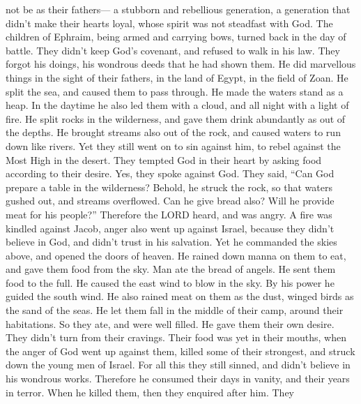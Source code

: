 not be as their fathers--- a stubborn and rebellious generation, a
generation that didn't make their hearts loyal, whose spirit was not
steadfast with God.  The children of Ephraim, being armed
and carrying bows, turned back in the day of battle.  They
didn't keep God's covenant, and refused to walk in his law.
 They forgot his doings, his wondrous deeds that he had
shown them.  He did marvellous things in the sight of their
fathers, in the land of Egypt, in the field of Zoan.  He
split the sea, and caused them to pass through. He made the waters stand
as a heap.  In the daytime he also led them with a cloud,
and all night with a light of fire.  He split rocks in the
wilderness, and gave them drink abundantly as out of the depths.
 He brought streams also out of the rock, and caused waters
to run down like rivers.  Yet they still went on to sin
against him, to rebel against the Most High in the desert. 
They tempted God in their heart by asking food according to their
desire.  Yes, they spoke against God. They said, ``Can God
prepare a table in the wilderness?  Behold, he struck the
rock, so that waters gushed out, and streams overflowed. Can he give
bread also? Will he provide meat for his people?'' 
Therefore the LORD heard, and was angry. A fire was kindled against
Jacob, anger also went up against Israel,  because they
didn't believe in God, and didn't trust in his salvation. 
Yet he commanded the skies above, and opened the doors of heaven.
 He rained down manna on them to eat, and gave them food
from the sky.  Man ate the bread of angels. He sent them
food to the full.  He caused the east wind to blow in the
sky. By his power he guided the south wind.  He also rained
meat on them as the dust, winged birds as the sand of the seas.
 He let them fall in the middle of their camp, around their
habitations.  So they ate, and were well filled. He gave
them their own desire.  They didn't turn from their
cravings. Their food was yet in their mouths,  when the
anger of God went up against them, killed some of their strongest, and
struck down the young men of Israel.  For all this they
still sinned, and didn't believe in his wondrous works. 
Therefore he consumed their days in vanity, and their years in terror.
 When he killed them, then they enquired after him. They
